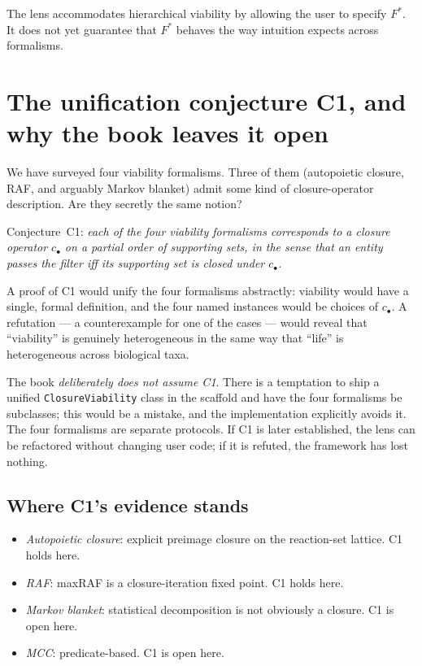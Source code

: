 The lens accommodates hierarchical viability by allowing the user to
specify $F^*$. It does not yet guarantee that $F^*$ behaves the way
intuition expects across formalisms.

\section{The unification conjecture C1, and why the book leaves it open}

We have surveyed four viability formalisms. Three of them (autopoietic
closure, RAF, and arguably Markov blanket) admit some kind of
closure-operator description. Are they secretly the same notion?

Conjecture~C1: \emph{each of the four viability formalisms corresponds
to a closure operator $c_\bullet$ on a partial order of supporting
sets, in the sense that an entity passes the filter iff its supporting
set is closed under $c_\bullet$.}

A proof of C1 would unify the four formalisms abstractly: viability
would have a single, formal definition, and the four named instances
would be choices of $c_\bullet$. A refutation --- a counterexample for
one of the cases --- would reveal that ``viability'' is genuinely
heterogeneous in the same way that ``life'' is heterogeneous across
biological taxa.

The book \emph{deliberately does not assume C1}. There is a temptation
to ship a unified \texttt{ClosureViability} class in the scaffold and
have the four formalisms be subclasses; this would be a mistake, and
the implementation explicitly avoids it. The four formalisms are
separate protocols. If C1 is later established, the lens can be
refactored without changing user code; if it is refuted, the framework
has lost nothing.

\subsection*{Where C1's evidence stands}

\begin{itemize}[leftmargin=1.5em,itemsep=2pt]
  \item \emph{Autopoietic closure}: explicit preimage closure on the
    reaction-set lattice. C1 holds here.
  \item \emph{RAF}: maxRAF is a closure-iteration fixed point. C1
    holds here.
  \item \emph{Markov blanket}: statistical decomposition is not
    obviously a closure. C1 is open here.
  \item \emph{MCC}: predicate-based. C1 is open here.
\end{itemize}

